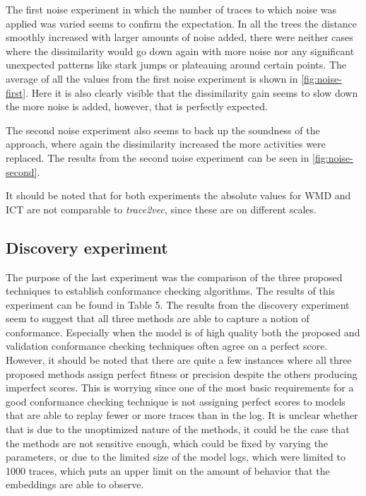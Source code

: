 \documentclass[runningheads]{template/llncs}
\begin{document}
The first noise experiment in which the number of traces to which noise was applied was varied seems to confirm the expectation.
In all the trees the distance smoothly increased with larger amounts of noise added, there were neither cases where the dissimilarity would go down again with more noise nor any significant unexpected patterns like stark jumps or plateauing around certain points.
The average of all the values from the first noise experiment is shown in \cref{fig:noise-first}.
Here it is also clearly visible that the dissimilarity gain seems to slow down the more noise is added, however, that is perfectly expected. 

The second noise experiment also seems to back up the soundness of the approach, where again the dissimilarity increased the more activities were replaced.
The results from the second noise experiment can be seen in \cref{fig:noise-second}.

It should be noted that for both experiments the absolute values for WMD and ICT are not comparable to \emph{trace2vec}, since these are on different scales.

\subsection{Discovery experiment}


The purpose of the last experiment was the comparison of the three proposed techniques to establish conformance checking algorithms.
The results of this experiment can be found in \cite{PBWe20} Table 5.
The results from the discovery experiment seem to suggest that all three methods are able to capture a notion of conformance.
Especially when the model is of high quality both the proposed and validation conformance checking techniques often agree on a perfect score.
However, it should be noted that there are quite a few instances where all three proposed methods assign perfect fitness or precision despite the others producing imperfect scores.
This is worrying since one of the most basic requirements for a good conformance checking technique is not assigning perfect scores to models that are able to replay fewer or more traces than in the log.
It is unclear whether that is due to the unoptimized nature of the methods, it could be the case that the methods are not sensitive enough, which could be fixed by varying the parameters, or due to the limited size of the model logs, which were limited to 1000 traces, which puts an upper limit on the amount of behavior that the embeddings are able to observe.
\end{document}
